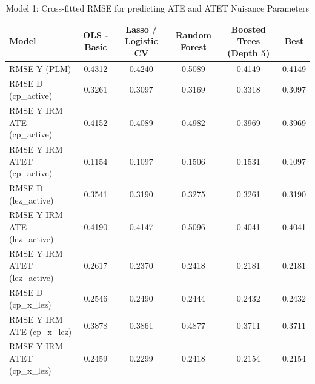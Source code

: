 \begin{table}
\caption{Model 1: Cross-fitted RMSE for predicting ATE and ATET Nuisance Parameters}
\label{tab:rmse_m1}
\begin{tabular}{lccccc}
\toprule
Model & OLS - Basic & Lasso / Logistic CV & Random Forest & Boosted Trees (Depth 5) & Best \\
\midrule
RMSE Y (PLM) & 0.4312 & 0.4240 & 0.5089 & 0.4149 & 0.4149 \\
RMSE D (cp_active) & 0.3261 & 0.3097 & 0.3169 & 0.3318 & 0.3097 \\
RMSE Y IRM ATE (cp_active) & 0.4152 & 0.4089 & 0.4982 & 0.3969 & 0.3969 \\
RMSE Y IRM ATET (cp_active) & 0.1154 & 0.1097 & 0.1506 & 0.1531 & 0.1097 \\
RMSE D (lez_active) & 0.3541 & 0.3190 & 0.3275 & 0.3261 & 0.3190 \\
RMSE Y IRM ATE (lez_active) & 0.4190 & 0.4147 & 0.5096 & 0.4041 & 0.4041 \\
RMSE Y IRM ATET (lez_active) & 0.2617 & 0.2370 & 0.2418 & 0.2181 & 0.2181 \\
RMSE D (cp_x_lez) & 0.2546 & 0.2490 & 0.2444 & 0.2432 & 0.2432 \\
RMSE Y IRM ATE (cp_x_lez) & 0.3878 & 0.3861 & 0.4877 & 0.3711 & 0.3711 \\
RMSE Y IRM ATET (cp_x_lez) & 0.2459 & 0.2299 & 0.2418 & 0.2154 & 0.2154 \\
\bottomrule
\end{tabular}
\end{table}
